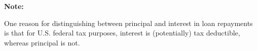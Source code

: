 \documentclass[12pt]{article}
\begin{document}
\begin{flushleft}
    \textbf{Note:} \\
\end{flushleft}

\begin{flushleft}
    One reason for distinguishing between principal and interest in loan repayments is that for U.S.
    federal tax purposes, interest is (potentially) tax deductible, whereas principal is not.
\end{flushleft}
\end{document}
